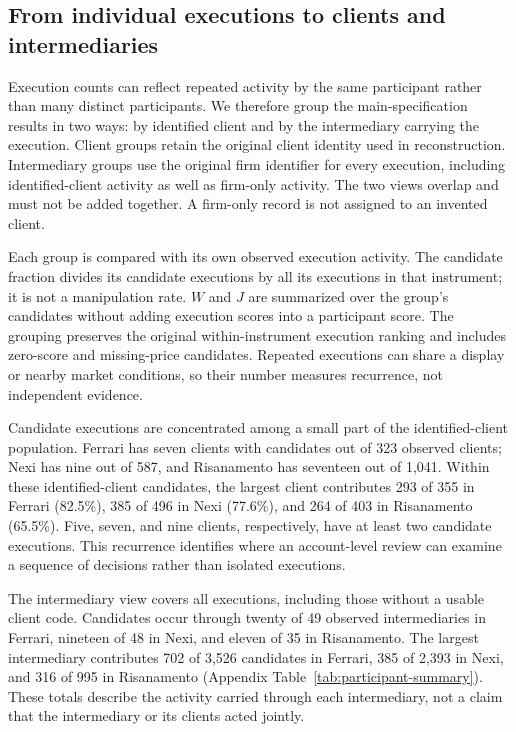 \documentclass[11pt]{article}
\begin{document}
\FloatBarrier
\subsection{From individual executions to clients and intermediaries}
\label{subsec:participant_group_results}

Execution counts can reflect repeated activity by the same participant rather than many distinct participants. We therefore group the main-specification results in two ways: by identified client and by the intermediary carrying the execution. Client groups retain the original client identity used in reconstruction. Intermediary groups use the original firm identifier for every execution, including identified-client activity as well as firm-only activity. The two views overlap and must not be added together. A firm-only record is not assigned to an invented client.

Each group is compared with its own observed execution activity. The candidate fraction divides its candidate executions by all its executions in that instrument; it is not a manipulation rate. $W$ and $J$ are summarized over the group's candidates without adding execution scores into a participant score. The grouping preserves the original within-instrument execution ranking and includes zero-score and missing-price candidates. Repeated executions can share a display or nearby market conditions, so their number measures recurrence, not independent evidence.

Candidate executions are concentrated among a small part of the identified-client population. Ferrari has seven clients with candidates out of 323 observed clients; Nexi has nine out of 587, and Risanamento has seventeen out of 1,041. Within these identified-client candidates, the largest client contributes 293 of 355 in Ferrari (82.5\%), 385 of 496 in Nexi (77.6\%), and 264 of 403 in Risanamento (65.5\%). Five, seven, and nine clients, respectively, have at least two candidate executions. This recurrence identifies where an account-level review can examine a sequence of decisions rather than isolated executions.

The intermediary view covers all executions, including those without a usable client code. Candidates occur through twenty of 49 observed intermediaries in Ferrari, nineteen of 48 in Nexi, and eleven of 35 in Risanamento. The largest intermediary contributes 702 of 3,526 candidates in Ferrari, 385 of 2,393 in Nexi, and 316 of 995 in Risanamento (Appendix Table~\ref{tab:participant-summary}). These totals describe the activity carried through each intermediary, not a claim that the intermediary or its clients acted jointly.
\end{document}
